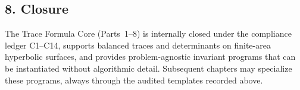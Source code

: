 \subsection*{8. Closure}\relax\hspace{0pt}
\label{subsec:tfc8-closure} %

\noindent
The Trace Formula Core (Parts~1--8) is internally closed under the compliance ledger C1--C14, supports balanced traces and determinants on finite-area hyperbolic surfaces, and provides problem-agnostic invariant programs that can be instantiated without algorithmic detail. Subsequent chapters may specialize these programs, always through the audited templates recorded above. \relax\hspace{0pt}


